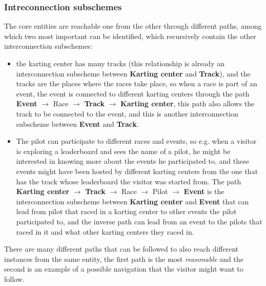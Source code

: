 \documentclass{beamer}
\begin{document}
\begin{frame}
    \frametitle{Intreconnection subschemes}
    \scriptsize
    The core entities are reachable one from the other through different paths, among which two most important can be identified, which recursively
    contain the other interconnection subschemes:
    \begin{itemize}
        \item the karting center has many tracks (this relationship is already an interconnection subscheme between \textbf{Karting center} and \textbf{Track}),
        and the tracks are the places where the races take place, so when a race is part of an event, the event is connected to different karting centers 
        through the path \textbf{Event} $\rightarrow$ Race $\rightarrow$ \textbf{Track} $\rightarrow$ \textbf{Karting center}, this path also allows
        the track to be connected to the event, and this is another interconnection subscheme between \textbf{Event} and \textbf{Track}.
        \item The pilot can participate to different races and events, so e.g. when a visitor is exploring a leaderboard and sees the name of 
        a pilot, he might be interested in knowing more about the events he participated to, and these events might have been hosted by different karting centers 
        from the one that has the track whose leaderboard the visitor was started from. The path \textbf{Karting center} $\rightarrow$ \textbf{Track} $\rightarrow$
        Race $\rightarrow$ Pilot $\rightarrow$ \textbf{Event} is the interconnection subscheme between \textbf{Karting center} and \textbf{Event} that can lead from pilot
        that raced in a karting center to other events the pilot participated to, and the inverse path can lead from an event to the pilots that raced in it
        and what other karting centers they raced in.
    \end{itemize}
    There are many different paths that can be followed to also reach different instances from the same entity, the first path is the most \textit{reasonable} and the 
    second is an example of a possible navigation that the visitor might want to follow.
\end{frame}
\end{document}
